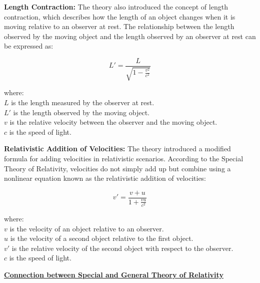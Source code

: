\documentclass{article}
\begin{document}
\vspace{1cm}

\begin{flushleft}
\textbf{Length Contraction:} The theory also introduced the concept of length contraction, which describes how the length of an object changes when it is moving relative to an observer at rest. The relationship between the length observed by the moving object and the length observed by an observer at rest can be expressed as:
\end{flushleft}

\[
L' = \frac{L}{\sqrt{1 - \frac{v^2}{c^2}}}
\]

\begin{flushleft}
where:\\
$L$ is the length measured by the observer at rest. \\
$L'$ is the length observed by the moving object. \\
$v$ is the relative velocity between the observer and the moving object. \\
$c$ is the speed of light.
\end{flushleft}

\vspace{1cm}

\begin{flushleft}
\textbf{Relativistic Addition of Velocities:} The theory introduced a modified formula for adding velocities in relativistic scenarios. According to the Special Theory of Relativity, velocities do not simply add up but combine using a nonlinear equation known as the relativistic addition of velocities:
\end{flushleft}

\[
v' = \frac{v + u}{1 + \frac{vu}{c^2}}
\]

\begin{flushleft}
where:\\
$v$ is the velocity of an object relative to an observer. \\
$u$ is the velocity of a second object relative to the first object. \\
$v'$ is the relative velocity of the second object with respect to the observer. \\
$c$ is the speed of light.
\end{flushleft}

\vspace{0.25cm}

\begin{flushleft}
\textbf{\underline{Connection between Special and General Theory of Relativity}}
\end{flushleft}
\end{document}
